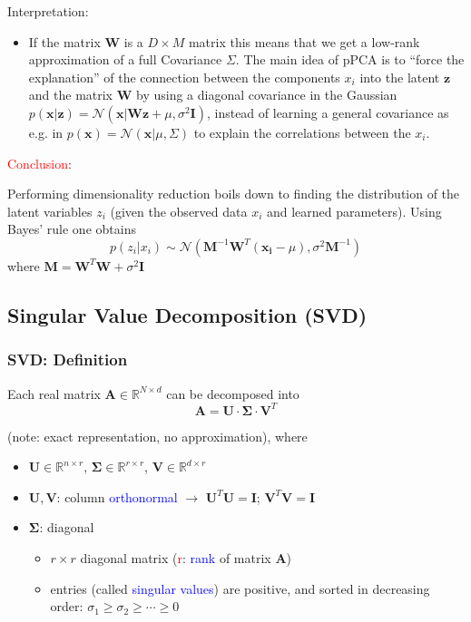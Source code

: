 \documentclass[a4paper,10pt,twoside=true,DIV=10,headsepline,plainheadsepline]{scrartcl}
\begin{document}
		Interpretation: 
			\begin{itemize}
				\item If the matrix $\mathbf{W}$ is a $D \times M$ matrix this means that we get a low-rank approximation of a full Covariance $\Sigma$. The main idea of pPCA is to “force the explanation” of the connection between the components $x_i$ into the latent $\mathbf{z}$ and the matrix $\mathbf{W}$ by using a diagonal covariance in the Gaussian $p(\mathbf{x}|\mathbf{z}) = \mathcal{N} (\mathbf{x} | \mathbf{W}\mathbf{z} + \mu, \sigma^2 \mathbf{I})$, instead of learning a general covariance as e.g. in $p(\mathbf{x}) = \mathcal{N} (\mathbf{x}|\mu, \Sigma)$ to explain the correlations between the $x_i$.
			\end{itemize}

		\textcolor{red}{Conclusion}:

		Performing dimensionality reduction boils down to finding the distribution of the latent variables $z_i$ (given the observed data $x_i$ and learned parameters). Using Bayes’ rule one obtains
		\begin{equation}
			p(z_i | x_i) \sim \mathcal{N} (\mathbf{M}^{-1} \mathbf{W}^T (\mathbf{x_i} - \mu ), \sigma^2 \mathbf{M}^{-1})
		\end{equation}
		where $\mathbf{M} = \mathbf{W}^T \mathbf{W} + \sigma^2 \mathbf{I}$
		
		\subsection{Singular Value Decomposition (SVD)}

		\subsubsection{SVD: Definition}

		Each real matrix $\mathbf{A} \in \mathbb{R}^{N \times d}$ can be decomposed into 
		\begin{equation}
			\mathbf{A} = \mathbf{U} \cdot \mathbf{\Sigma} \cdot \mathbf{V}^T 
		\end{equation}

		(note: exact representation, no approximation), where

		\begin{itemize}
			\item $\mathbf{U} \in \mathbb{R}^{n \times r}$, $\mathbf{\Sigma} \in \mathbb{R}^{r \times r}$, $\mathbf{V} \in \mathbb{R}^{d \times r}$
			\item $\mathbf{U}, \mathbf{V}$: column \textcolor{blue}{orthonormal} $\rightarrow$ $\mathbf{U}^T \mathbf{U} = \mathbf{I}$; $\mathbf{V}^T \mathbf{V} = \mathbf{I}$
			\item $\mathbf{\Sigma}$: diagonal 
			\begin{itemize}[noitemsep]
			\item $r \times r$ diagonal matrix (\textcolor{red}{r}: \textcolor{blue}{rank} of matrix $\mathbf{A}$)
			\item entries (called \textcolor{blue}{singular values}) are positive, and sorted in decreasing order: $\sigma_1 \geq \sigma_2 \geq \cdots \geq 0$
			\end{itemize}
		\end{itemize}
\end{document}
